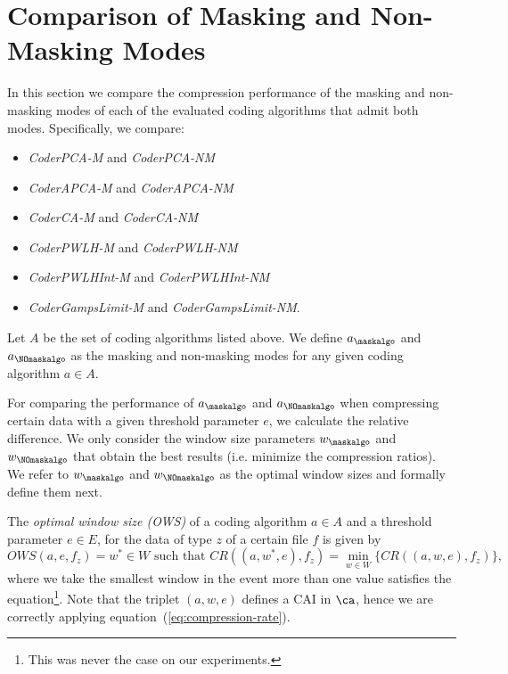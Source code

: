 \section{Comparison of Masking and Non-Masking Modes}
\label{secX:rendimiento-relativo}


In this section we compare the compression performance of the masking and non-masking modes of each of the evaluated coding algorithms that admit both modes. Specifically, we compare:


\vspace{-5pt}
\begin{itemize}
    \item \textit{CoderPCA-M} and \textit{CoderPCA-NM}
    \item \textit{CoderAPCA-M} and \textit{CoderAPCA-NM}
    \item \textit{CoderCA-M} and \textit{CoderCA-NM}
    \item \textit{CoderPWLH-M} and \textit{CoderPWLH-NM}
    \item \textit{CoderPWLHInt-M} and \textit{CoderPWLHInt-NM} 
    \item \textit{CoderGampsLimit-M} and \textit{CoderGampsLimit-NM}.
\end{itemize}


\vspace{+5pt}
\begin{defcion}
Let $A$ be the set of coding algorithms listed above. We define $a_\maskalgo$ and $a_\NOmaskalgo$ as the masking and non-masking modes for any given coding algorithm $a \in A$.
\end{defcion}


For comparing the performance of $a_\maskalgo$ and $a_\NOmaskalgo$ when compressing certain data with a given threshold parameter $e$, we calculate the relative difference. We only consider the window size parameters $w_\maskalgo$ and $w_\NOmaskalgo$ that obtain the best results (i.e. minimize the compression ratios). We refer to $w_\maskalgo$ and $w_\NOmaskalgo$ as the optimal window sizes and formally define them next.


\clearpage


\newcommand{\footows}{This was never the case on our experiments.}
\begin{defcion}
The \textit{optimal window size (OWS)} of a coding algorithm $a \in A$ and a threshold parameter $e \in E$, for the data of type $z$ of a certain file $f$ is given by
\begin{equation}
OWS(a, e, f_z) = w^{*} \in W \text{ such that } CR((a, w^{*}, e), f_z) = \min_{w \in W} \biggl\{ CR((a, w, e), f_z) \biggr\},
\end{equation}
where we take the smallest window in the event more than one value satisfies the equation\footnote{\footows}. Note that the triplet $(a, w, e)$ defines a CAI in $\ca$, hence we are correctly applying equation~(\ref{eq:compression-rate}).
\end{defcion}


